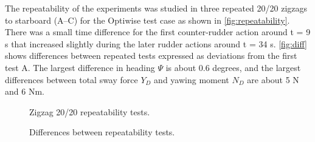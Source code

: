 \noindent The repeatability of the experiments was studied in three repeated 20/20 zigzags to starboard (A--C) for the Optiwise test case as shown in \autoref{fig:repeatability}. There was a small time difference for the first counter-rudder action around t = 9 s that increased slightly during the later rudder actions around t = 34 s.
\autoref{fig:diff} shows differences between repeated tests expressed as deviations from the first test A. The largest difference in heading $\Psi$ is about 0.6 degrees, and the largest differences between total sway force $Y_D$ and yawing moment $N_D$ are about 5 N and 6 Nm.   
\begin{figure}[h!]
    \centering   
    
    \caption{Zigzag 20/20 repeatability tests.}
    \label{fig:repeatability}
\end{figure}
\begin{figure}[h!]
    \centering   
    
    \caption{Differences between repeatability tests.}
    \label{fig:diff}
\end{figure}
%    
%
%    
